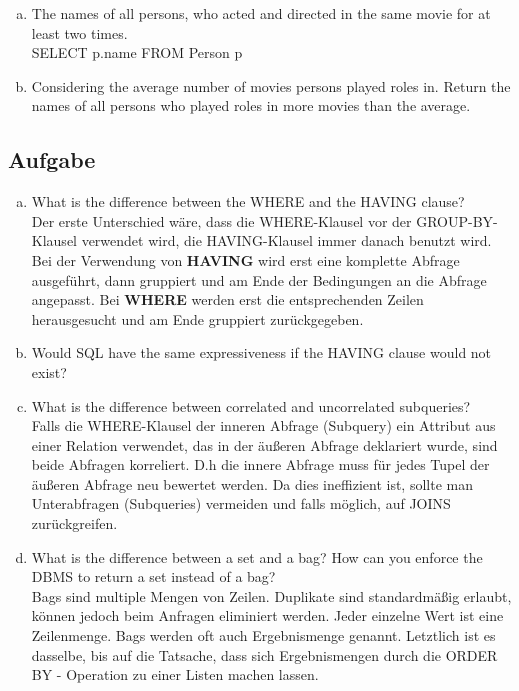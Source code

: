 \documentclass[11pt,a4paper,DIV=9]{scrartcl}
\newcounter{temp}
\newcommand{\aufgabe}[1]{
  \setcounter{temp}{\value{subsection}}
  \setcounter{subsection}{#1}
  \addtocounter{subsection}{-1}
  \subsection{Aufgabe}
  \setcounter{subsection}{\value{temp}}
}
\begin{document}
\begin{enumerate}[a.]
           \item The names of all persons, who acted and directed in the same movie for at least two times.\hfill\\ %
           SELECT p.name
           FROM Person p
           
           \item Considering the average number of movies persons played roles in. Return the names of all persons who played roles in more movies than the average.\hfill\\ %

    \end{enumerate}
\aufgabe{2}
\begin{enumerate}[a.]
\item What is the difference between the WHERE and the HAVING clause? \hfill\\
 Der erste Unterschied w\"are, dass die WHERE-Klausel vor der GROUP-BY-Klausel verwendet wird, die HAVING-Klausel immer danach benutzt wird. Bei der Verwendung von \textbf{HAVING} wird erst eine komplette Abfrage ausgef\"uhrt, dann gruppiert und am Ende der Bedingungen an die Abfrage angepasst. Bei \textbf{WHERE} werden erst die entsprechenden Zeilen herausgesucht und am Ende gruppiert zur\"uckgegeben.
\item Would SQL have the same expressiveness if the HAVING clause would not exist? \hfill\\
\item What is the difference between correlated and uncorrelated subqueries? \hfill\\
Falls die WHERE-Klausel der inneren Abfrage (Subquery) ein Attribut aus einer Relation verwendet, das in der \"au{\ss}eren Abfrage deklariert wurde, sind beide Abfragen korreliert. D.h die innere Abfrage muss f\"ur jedes Tupel der \"au{\ss}eren Abfrage neu bewertet werden. Da dies ineffizient ist, sollte man Unterabfragen (Subqueries) vermeiden und falls m\"oglich, auf JOINS zur\"uckgreifen.
\item What is the difference between a set and a bag? How can you enforce the DBMS to return a set instead of a bag? \\
Bags sind multiple Mengen von Zeilen. Duplikate sind standardm\"a{\ss}ig erlaubt, k\"onnen jedoch beim Anfragen eliminiert werden. Jeder einzelne Wert ist eine Zeilenmenge. Bags werden oft auch Ergebnismenge genannt. Letztlich ist es dasselbe, bis auf die Tatsache, dass sich Ergebnismengen durch die ORDER BY - Operation zu einer Listen machen lassen.

 \end{enumerate}
\end{document}
